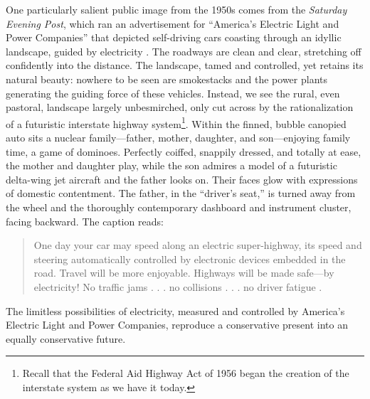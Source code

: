 One particularly salient public image from the 1950s comes from the
\emph{Saturday Evening Post}, which ran an advertisement for ``America's
Electric Light and Power Companies'' that depicted self-driving cars
coasting through an idyllic landscape, guided by electricity
\cite{weber}. The roadways 
are clean and clear, stretching off confidently into the distance. The
landscape, tamed and controlled, yet retains its natural beauty:
nowhere to be seen are smokestacks and the power plants generating the
guiding force of these vehicles. Instead, we see the rural, even
pastoral, landscape largely unbesmirched, only cut across by the
rationalization of a futuristic interstate highway system\footnote{Recall that
the Federal Aid Highway Act of 1956 began the creation of the
interstate system as we have it today.}. Within the finned, bubble
canopied auto sits a nuclear family---father,
mother, daughter, and son---enjoying family time, a game of dominoes.
Perfectly coiffed, snappily dressed, and totally at ease, the mother
and daughter play, while the son admires a model of a futuristic
delta-wing jet aircraft and the father looks on. Their faces glow with
expressions of domestic contentment. The father, in the ``driver's
seat,'' is turned away from the wheel and the thoroughly contemporary
dashboard and instrument cluster, facing backward. The caption reads: 
\begin{quote}
One day your car may speed along an electric super-highway, its speed
and steering automatically controlled by electronic devices embedded
in the road. Travel will be more enjoyable. Highways will be made
safe---by electricity! No traffic jams . . . no collisions . . . no
driver fatigue \cite{weber}.
\end{quote}
The limitless possibilities of electricity, measured and controlled by
America's Electric Light and Power Companies, reproduce a conservative
present into an equally conservative future. 

